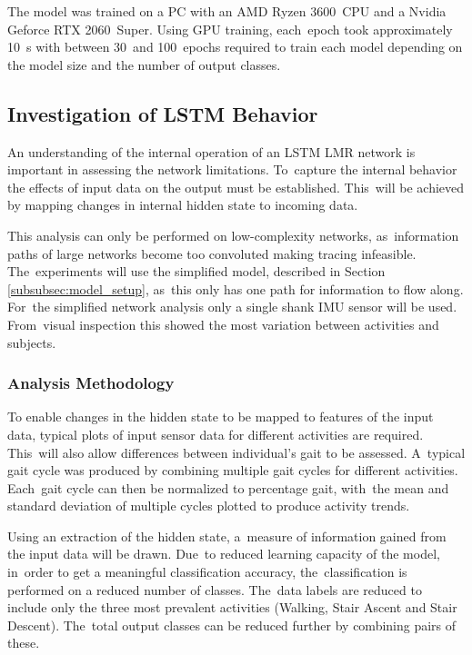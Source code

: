 The model was trained on a PC with an AMD Ryzen 3600~CPU and a Nvidia Geforce RTX 2060~Super. Using GPU training, each~epoch took approximately 10~s with between 30~and 100~epochs required to train each model depending on the model size and the number of output classes.


\subsection{Investigation of LSTM Behavior}
\label{sec:simplified_model}
An understanding of the internal operation of an LSTM LMR network is important in assessing the network limitations. To~capture the internal behavior the effects of input data on the output must be established. This~will be achieved by mapping changes in internal hidden state to incoming data.

This analysis can only be performed on low-complexity networks, as~information paths of large networks become too convoluted making tracing infeasible. The~experiments will use the simplified model, described in Section \ref{subsubsec:model_setup}, as~this only has one path for information to flow along. For~the simplified network analysis only a single shank IMU sensor will be used. From~visual inspection this showed the most variation between activities and subjects.

\subsubsection{Analysis Methodology}
To enable changes in the hidden state to be mapped to features of the input data, typical plots of input sensor data for different activities are required. This~will also allow differences between individual's gait to be assessed. A~typical gait cycle was produced by combining multiple gait cycles for different activities. Each~gait cycle can then be normalized to percentage gait, with~the mean and standard deviation of multiple cycles plotted to produce activity trends.

Using an extraction of the hidden state, a~measure of information gained from the input data will be drawn. Due~to reduced learning capacity of the model, in~order to get a meaningful classification accuracy, the~classification is performed on a reduced number of classes. The~data labels are reduced to include only the three most prevalent activities (Walking, Stair Ascent and Stair Descent). The~total output classes can be reduced further by combining pairs of these. 


